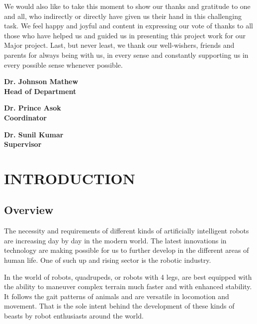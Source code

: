 \documentclass[12pt,a4paper]{report}
\begin{document}
     We would also like to take this moment to show our thanks and gratitude to one and all, who indirectly or directly have given us their hand in this challenging task. We feel happy and joyful and content in expressing our vote of thanks to all those who have helped us and guided us in presenting this project work for our Major project. Last, but never least, we thank our well-wishers, friends and parents for always being with us, in every sense and constantly supporting us in every possible sense whenever possible.

\vspace{2 cm}                        
\begin{multicols}{3}
\centering
\textbf{Dr. Johnson Mathew}\\
\textbf{Head of Department}\\
\vspace{0.3cm}


\textbf{Dr. Prince Asok}\\
\textbf{Coordinator}\\
\vspace{0.3cm}


\textbf{Dr. Sunil Kumar}\\
\textbf{Supervisor}\\
\vspace{0.3cm}
\end{multicols}





\newpage
\chapter{INTRODUCTION}
\section{Overview}

The necessity and requirements of different kinds of artificially intelligent robots are increasing day by day in the modern world. The latest innovations in technology are making possible for us to further develop in the different areas of human life. One of such up and rising sector is the robotic industry. 

In the world of robots, quadrupeds, or robots with 4 legs, are best equipped with the ability to maneuver complex terrain much faster and with enhanced stability. It follows the gait patterns of animals and are versatile in locomotion and movement. That is the sole intent behind the development of these kinds of beasts by robot enthusiasts around the world.
\end{document}
